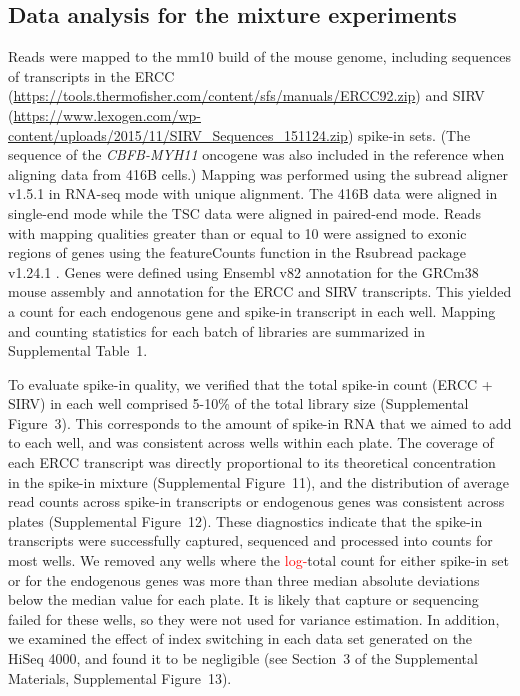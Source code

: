 \documentclass{article}
\newcommand{\suppfigtotals}{3}
\newcommand{\suppfigspikeconc}{11}
\newcommand{\suppfigspikeave}{12}
\newcommand{\suppfigindex}{13}
\newcommand{\suppsecindex}{3}
\newcommand{\supptabstats}{1}
\newcommand{\revised}[1]{\textcolor{red}{#1}}
\begin{document}
\subsection*{Data analysis for the mixture experiments}
Reads were mapped to the mm10 build of the mouse genome, including sequences of transcripts in the ERCC (\url{https://tools.thermofisher.com/content/sfs/manuals/ERCC92.zip}) and SIRV (\url{https://www.lexogen.com/wp-content/uploads/2015/11/SIRV_Sequences_151124.zip}) spike-in sets.
(The sequence of the \textit{CBFB-MYH11} oncogene was also included in the reference when aligning data from 416B cells.)
Mapping was performed using the subread aligner v1.5.1 \autocite{liao2013subread} in RNA-seq mode with unique alignment.
The 416B data were aligned in single-end mode while the TSC data were aligned in paired-end mode.
Reads with mapping qualities greater than or equal to 10 were assigned to exonic regions of genes using the featureCounts function in the Rsubread package v1.24.1 \autocite{liao2014featurecounts}.
Genes were defined using Ensembl v82 annotation for the GRCm38 mouse assembly and annotation for the ERCC and SIRV transcripts.
This yielded a count for each endogenous gene and spike-in transcript in each well.
Mapping and counting statistics for each batch of libraries are summarized in Supplemental Table~\supptabstats{}.

To evaluate spike-in quality, we verified that the total spike-in count (ERCC + SIRV) in each well comprised 5-10\% of the total library size (Supplemental Figure~\suppfigtotals{}).
This corresponds to the amount of spike-in RNA that we aimed to add to each well, and was consistent across wells within each plate.
The coverage of each ERCC transcript was directly proportional to its theoretical concentration in the spike-in mixture (Supplemental Figure~\suppfigspikeconc{}),
and the distribution of average read counts across spike-in transcripts or endogenous genes was consistent across plates (Supplemental Figure~\suppfigspikeave{}).
These diagnostics indicate that the spike-in transcripts were successfully captured, sequenced and processed into counts for most wells.
We removed any wells where the \revised{log-}total count for either spike-in set or for the endogenous genes was more than three median absolute deviations below the median value for each plate. 
It is likely that capture or sequencing failed for these wells, so they were not used for variance estimation.
In addition, we examined the effect of index switching \autocite{sinha2017index} in each data set generated on the HiSeq 4000, and found it to be negligible (see Section~\suppsecindex{} of the Supplemental Materials, Supplemental Figure~\suppfigindex{}).
\end{document}
